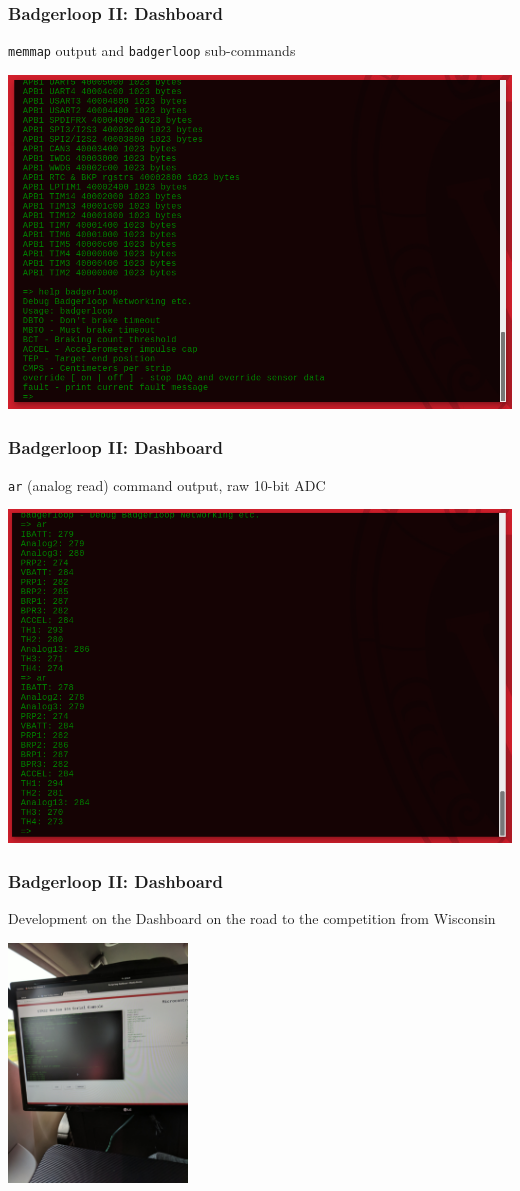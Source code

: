 \documentclass{beamer}
\begin{document}
\begin{frame}
\frametitle{Badgerloop II: Dashboard}
    \texttt{memmap} output and \texttt{badgerloop} sub-commands
\begin{center}
    \includegraphics[width=\linewidth]{assets/badgerloop_2/Dashboard/dash_cli_example}
\end{center}
\end{frame}

\begin{frame}
\frametitle{Badgerloop II: Dashboard}
    \texttt{ar} (analog read) command output, raw 10-bit ADC
\begin{center}
    \includegraphics[width=\linewidth]{assets/badgerloop_2/Dashboard/dash_live_ar}
\end{center}
\end{frame}

\begin{frame}
\frametitle{Badgerloop II: Dashboard}
    Development on the Dashboard on the road to the competition from Wisconsin
\begin{center}
    \includegraphics[height=2.5in]{assets/badgerloop_2/Dashboard/in_the_car}
\end{center}
\end{frame}
\end{document}
